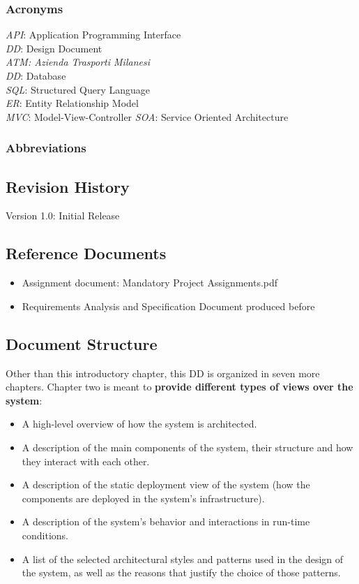 \documentclass[12pt]{article}
\begin{document}
\subsubsection{Acronyms}
\textit{API}: Application Programming Interface\\
\textit{DD}: Design Document\\
\textit{ATM: Azienda Trasporti Milanesi}\\
\textit{DD}: Database\\
\textit{SQL}: Structured Query Language\\
\textit{ER}: Entity Relationship Model\\
\textit{MVC}: Model-View-Controller
\textit{SOA}: Service Oriented Architecture
\subsubsection{Abbreviations}


\subsection{Revision History}
Version 1.0: Initial Release

\subsection{Reference Documents}
\begin{itemize}
    \item Assignment document: Mandatory Project Assignments.pdf
    \item Requirements Analysis and Specification Document produced before
\end{itemize}


\subsection{Document Structure}

Other than this introductory chapter, this DD is organized in seven more chapters. Chapter two is meant to \textbf{provide different types of views over the system}:
\begin{itemize}
    \item A high-level overview of how the system is architected.
    \item A description of the main components of the system, their structure and how they interact with each other.
    \item A description of the static deployment view of the system (how the components are deployed in the system's infrastructure). 
    \item A description of the system's behavior and interactions in run-time conditions.
    \item A list of the selected architectural styles and patterns used in the design of the system, as well as the reasons that justify the choice of those patterns.
\end{itemize}
\end{document}
